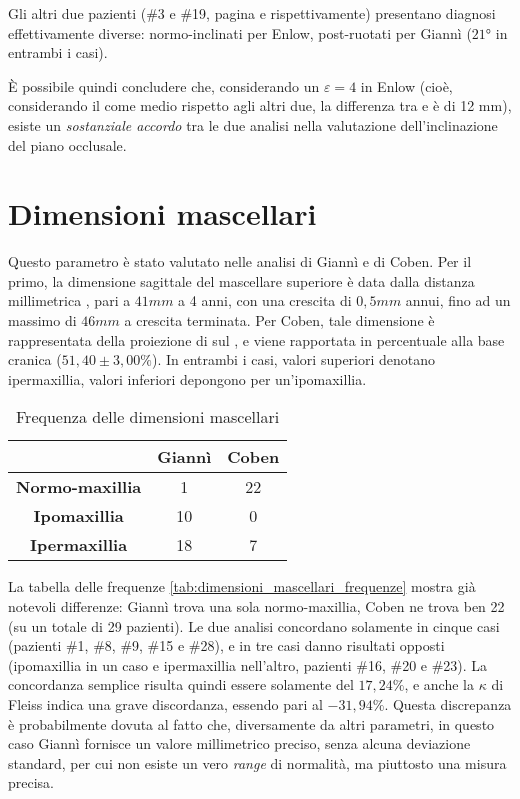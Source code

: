 Gli altri due pazienti (\#3 e \#19, pagina \pageref{paz:MASCHI2000} e \pageref{paz:ELITRI1998} rispettivamente) presentano diagnosi effettivamente diverse: normo-inclinati per Enlow, post-ruotati per Giannì ($21°$ in entrambi i casi).

È possibile quindi concludere che, considerando un $\varepsilon = 4$ in Enlow (cioè, considerando il  come medio rispetto agli altri due, la differenza tra  e  è di 12 mm), esiste un \emph{sostanziale accordo} tra le due analisi nella valutazione dell'inclinazione del piano occlusale.

\section{Dimensioni mascellari}
Questo parametro è stato valutato nelle analisi di Giannì e di Coben. Per il primo, la dimensione sagittale del mascellare superiore è data dalla distanza millimetrica , pari a $41 mm$ a 4 anni, con una crescita di $0,5 mm$ annui, fino ad un massimo di $46 mm$ a crescita terminata. Per Coben, tale dimensione è rappresentata della proiezione di  sul , e viene rapportata in percentuale alla base cranica  ($51,40 \pm 3,00\%$). In entrambi i casi, valori superiori denotano ipermaxillia, valori inferiori depongono per un'ipomaxillia.

\begin{table}
\centering
\caption{Frequenza delle dimensioni mascellari}
\label{tab:dimensioni_mascellari_frequenze}
\begin{tabular}{>{\bfseries}ccc}
\toprule
& \textbf{Giannì} & \textbf{Coben} \\
\midrule
Normo-maxillia & 1 & 22 \\
Ipomaxillia & 10 & 0 \\
Ipermaxillia & 18 & 7 \\
\bottomrule
\end{tabular}
\end{table}

La tabella delle frequenze \vref{tab:dimensioni_mascellari_frequenze} mostra già notevoli differenze: Giannì trova una sola normo-maxillia, Coben ne trova ben 22 (su un totale di 29 pazienti). Le due analisi concordano solamente in cinque casi (pazienti \#1, \#8, \#9, \#15 e \#28), e in tre casi danno risultati opposti (ipomaxillia in un caso e ipermaxillia nell'altro, pazienti \#16, \#20 e \#23). La concordanza semplice risulta quindi essere solamente del $17,24\%$, e anche la $\kappa$ di Fleiss indica una grave discordanza, essendo pari al $-31,94\%$. Questa discrepanza è probabilmente dovuta al fatto che, diversamente da altri parametri, in questo caso Giannì fornisce un valore millimetrico preciso, senza alcuna deviazione standard, per cui non esiste un vero \emph{range} di normalità, ma piuttosto una misura precisa.

